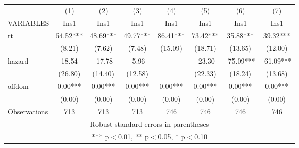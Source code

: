 \begin{tabular}{lccccccc} \hline
 & (1) & (2) & (3) & (4) & (5) & (6) & (7) \\
VARIABLES & Ins1 & Ins1 & Ins1 & Ins1 & Ins1 & Ins1 & Ins1 \\ \hline
rt & 54.52*** & 48.69*** & 49.77*** & 86.41*** & 73.42*** & 35.88*** & 39.32*** \\
 & (8.21) & (7.62) & (7.48) & (15.09) & (18.71) & (13.65) & (12.00) \\
hazard & 18.54 & -17.78 & -5.96 &  & -23.30 & -75.09*** & -61.09*** \\
 & (26.80) & (14.40) & (12.58) &  & (22.33) & (18.24) & (13.68) \\
offdom & 0.00*** & 0.00*** & 0.00*** & 0.00*** & 0.00*** & 0.00*** & 0.00*** \\
 & (0.00) & (0.00) & (0.00) & (0.00) & (0.00) & (0.00) & (0.00) \\
Observations & 713 & 713 & 713 & 746 & 746 & 746 & 746 \\ \hline
\multicolumn{8}{c}{Robust standard errors in parentheses} \\
\multicolumn{8}{c}{*** p$<$0.01, ** p$<$0.05, * p$<$0.10} \\
\end{tabular}